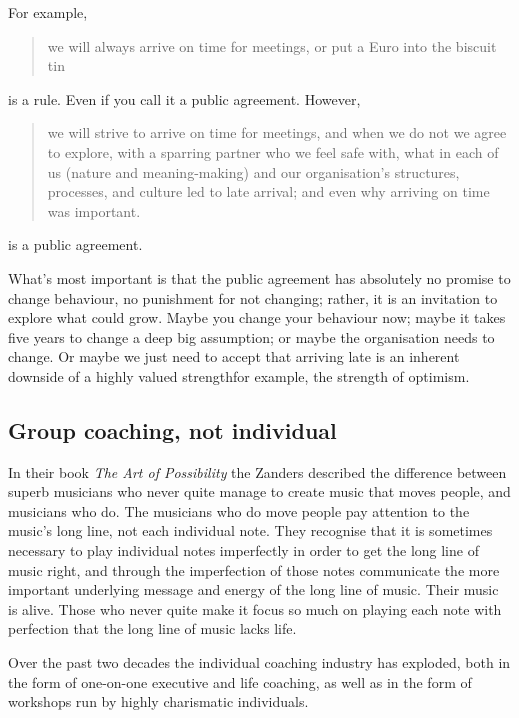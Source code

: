 For example, 


\begin{quote} 
we will always arrive on time for meetings, or put a Euro into the biscuit tin 
\end{quote} 
is a rule. Even if you call it a public agreement. However, 


\begin{quote} 
we will strive to arrive on time for meetings, and when we do not we agree to explore, with a sparring partner who we feel safe with, what in each of us (nature and meaning\hyp{}making) and our organisation’s structures, processes, and culture led to late arrival; and even why arriving on time was important. 
\end{quote} 
is a public agreement.


What’s most important is that the public agreement has absolutely no promise to change behaviour, no punishment for not changing; rather, it is an invitation to explore what could grow. Maybe you change your behaviour now; maybe it takes five years to change a deep big assumption; or maybe the organisation needs to change. Or maybe we just need to accept that arriving late is an inherent downside of a highly valued strength\textemdash for example, the strength of optimism.






\subsection{Group coaching, not individual}
\label{section:team-coaching}
In their book \emph{The Art of Possibility}\cite{zander-art} the Zanders described the difference between superb musicians who never quite manage to create music that moves people, and musicians who do. The musicians who do move people pay attention to the music’s long line, not each individual note. They recognise that it is sometimes necessary to play individual notes imperfectly in order to get the long line of music right, and through the imperfection of those notes communicate the more important underlying message and energy of the long line of music. Their music is alive. Those who never quite make it focus so much on playing each note with perfection that the long line of music lacks life.


Over the past two decades the individual coaching industry has exploded, both in the form of one-on-one executive and life coaching, as well as in the form of workshops run by highly charismatic individuals. 


